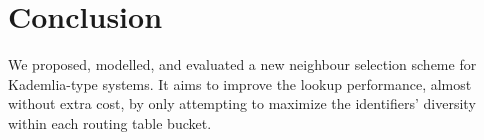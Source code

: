 \documentclass[10pt, conference, compsocconf, letterpaper]{IEEEtran}
\begin{document}
\begin{comment}
\begin{table}[t]
  \captionsetup{font=scriptsize}
 \caption{Average hop count (simulations vs. model expectations) for three exemplary Kademlia-type systems of size \textcolor{red}{10000}:\\Standard design, modified design, and the performance improvement achieved by the modified design (+).}
\centering 
\scriptsize 
 \begin{tabular}{|l|c||c||c|}
 \cline{2-4}
 \multicolumn{1}{c|}{} & \multicolumn{1}{c||}{MDHT} & \multicolumn{1}{c||}{iMDHT} & \multicolumn{1}{c|}{KAD} \\
 
 \hline
Standard  & 3.75727 $\pm$ 0.02778 & 3.42332 $\pm$ 0.01667 & 3.33940 $\pm$ 0.01011
 \\
 \hline
 Modified & 3.69480 $\pm$ 0.01468 & 3.27271 $\pm$ 0.01227 & 3.12883 $\pm$ 0.01686
 \\
 \hline
  ~~~~+   & 1.66264 \%		   	 & 4.39953 \%			 & 6.30562 \%
  \\
 \hline
 \end{tabular}
 \label{tab:average_meas}
 \end{table}
\end{comment}



\begin{comment}
\begin{figure} \centering
\captionsetup{font=scriptsize}
      \texttt{[image: all\_hcd\_measure.eps]} 
   \caption{CDF of hop count distributions from measurements of standard and modified KAD clients. (\textbf{s:} standard client; \textbf{m:} modified client)}
   \label{fig:all_hop_count_measure_dist}
\end{figure}
\end{comment}







\section{Conclusion} \label{sec:conclusion}
We proposed, modelled, and evaluated a new neighbour selection scheme for Kademlia-type systems. It aims to improve the lookup performance, almost without extra cost, by only attempting to maximize the identifiers' diversity within each routing table bucket.  
\end{document}
